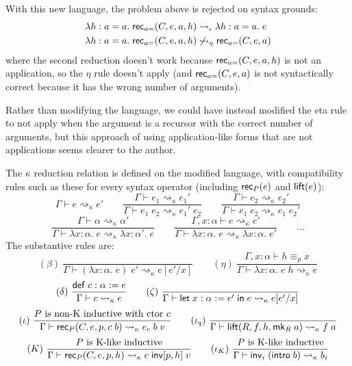 With this new language, the problem above is rejected on syntax grounds:
\begin{align*}
&\lambda h:a=a.\;\mathsf{rec}_{a=}(C,e,a,h)\rightsquigarrow_\iota\lambda h:a=a.\;e\\
&\lambda h:a=a.\;\mathsf{rec}_{a=}(C,e,a,h)\not\rightsquigarrow_\eta\mathsf{rec}_{a=}(C,e,a)
\end{align*}
where the second reduction doesn't work because $\mathsf{rec}_{a=}(C,e,a,h)$ is not an application, so the $\eta$ rule doesn't apply (and $\mathsf{rec}_{a=}(C,e,a)$ is not syntactically correct because it has the wrong number of arguments).

\begin{remark}
Rather than modifying the language, we could have instead modified the eta rule to not apply when the argument is a recursor with the correct number of arguments, but this approach of using application-like forms that are not applications seems clearer to the author.
\end{remark}

The $\kappa$ reduction relation is defined on the modified language, with compatibility rules such as these for every syntax operator (including $\mathsf{rec}_P(e)$ and $\mathsf{lift}(e)$):
$$\boxed{\Gamma\vdash e\rightsquigarrow_\kappa e'}\qquad
\frac{\Gamma\vdash e_1 \rightsquigarrow_\kappa e_1'}{\Gamma\vdash e_1\;e_2\rightsquigarrow_\kappa e_1'\;e_2}\qquad
\frac{\Gamma\vdash e_2 \rightsquigarrow_\kappa e_2'}{\Gamma\vdash e_1\;e_2\rightsquigarrow_\kappa e_1\;e_2'}$$
$$\frac{\Gamma\vdash \alpha \rightsquigarrow_\kappa\alpha'}{\Gamma\vdash \lambda x:\alpha.\;e\rightsquigarrow_\kappa \lambda x:\alpha'.\;e}\qquad
\frac{\Gamma,x:\alpha\vdash e \rightsquigarrow_\kappa e'}{\Gamma\vdash \lambda x:\alpha.\;e\rightsquigarrow_\kappa \lambda x:\alpha.\;e'}\qquad\dots$$
The substantive rules are:
$$(\beta)\ \frac{}{\Gamma\vdash (\lambda x:\alpha.\;e)\;e'\rightsquigarrow_\kappa e[e'/x]}\qquad
(\eta)\ \frac{\Gamma,x:\alpha\vdash h\equiv_p x}{\Gamma\vdash \lambda x:\alpha.\;e\;h\rightsquigarrow_\kappa e}$$
$$(\delta)\ \frac{\mathsf{def}\;c:\alpha:=e}{\Gamma\vdash c\rightsquigarrow_\kappa e}\qquad
(\zeta)\ \frac{}{\Gamma\vdash \elet{x:\alpha:=e'}{e}\rightsquigarrow_\kappa e[e'/x]}$$
$$(\iota)\ \frac{P\mbox{ is non-K inductive with ctor }c}{\Gamma\vdash \rec_P(C,e,p,c\;b)\rightsquigarrow_\kappa e_c\;b\;v}\qquad
(\iota_q)\ \frac{}{\Gamma\vdash \lift(R,f,h,\mk_R\;a)\rightsquigarrow_\kappa f\;a}$$
$$(K)\ \frac{P\mbox{ is K-like inductive}}{\Gamma\vdash \rec_P(C,e,p,h)\rightsquigarrow_\kappa e\;\inv[p,h]\;v}\qquad
(\iota_K)\ \frac{P\mbox{ is K-like inductive}}{\Gamma\vdash\inv_i\;(\intro\;b)\rightsquigarrow_\kappa b_i}$$

